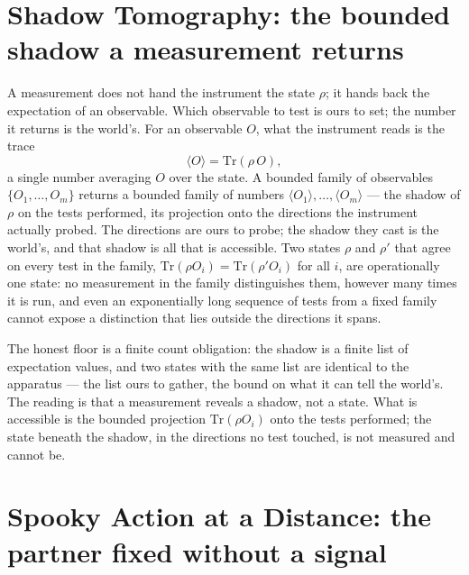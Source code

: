 \section{Shadow Tomography: the bounded shadow a measurement returns}
\label{se:shadow-tomography}

A measurement does not hand the instrument the state $\rho$; it hands back the expectation of an observable.
Which observable to test is ours to set; the number it returns is the world's. For an observable $O$, what the
instrument reads is the trace
\begin{equation}
  \langle O\rangle = \mathrm{Tr}(\rho\, O),
\end{equation}
a single number averaging $O$ over the state. A bounded family of observables $\{O_1, \ldots, O_m\}$ returns a
bounded family of numbers $\langle O_1\rangle, \ldots, \langle O_m\rangle$ --- the shadow of $\rho$ on the
tests performed, its projection onto the directions the instrument actually probed. The directions are ours to
probe; the shadow they cast is the world's, and that shadow is all that is accessible. Two states $\rho$ and $\rho'$ that agree on every test in the family, $\mathrm{Tr}(\rho O_i) =
\mathrm{Tr}(\rho' O_i)$ for all $i$, are operationally one state: no measurement in the family distinguishes
them, however many times it is run, and even an exponentially long sequence of tests from a fixed family
cannot expose a distinction that lies outside the directions it spans.

The honest floor is a finite count obligation: the shadow is a finite list of expectation values, and two
states with the same list are identical to the apparatus --- the list ours to gather, the bound on what it can
tell the world's. The reading is that a measurement reveals a shadow,
not a state. What is accessible is the bounded projection $\mathrm{Tr}(\rho O_i)$ onto the tests performed; the
state beneath the shadow, in the directions no test touched, is not measured and cannot be.

\section{Spooky Action at a Distance: the partner fixed without a signal}
\label{se:epr}

